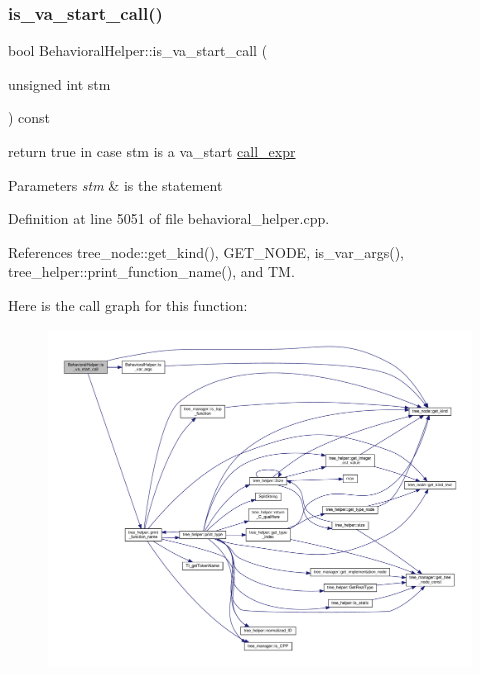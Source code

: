 \subsubsection{\texorpdfstring{is\+\_\+va\+\_\+start\+\_\+call()}{is\_va\_start\_call()}}
{\footnotesize\ttfamily bool Behavioral\+Helper\+::is\+\_\+va\+\_\+start\+\_\+call (\begin{DoxyParamCaption}\item[{unsigned int}]{stm }\end{DoxyParamCaption}) const\hspace{0.3cm}{\ttfamily [virtual]}}



return true in case stm is a va\+\_\+start \hyperlink{structcall__expr}{call\+\_\+expr} 


\begin{DoxyParams}{Parameters}
{\em stm} & is the statement \\
\hline
\end{DoxyParams}


Definition at line 5051 of file behavioral\+\_\+helper.\+cpp.



References tree\+\_\+node\+::get\+\_\+kind(), G\+E\+T\+\_\+\+N\+O\+DE, is\+\_\+var\+\_\+args(), tree\+\_\+helper\+::print\+\_\+function\+\_\+name(), and TM.

Here is the call graph for this function\+:
\nopagebreak
\begin{figure}[H]
\begin{center}
\leavevmode
\includegraphics[width=350pt]{dd/db2/classBehavioralHelper_a48be8bee053a0b3d8e4f37b7f249ced2_cgraph}
\end{center}
\end{figure}
\mbox{\label{classBehavioralHelper_adc713dd555c80762dbbc0f4fbe052ce9}} 
